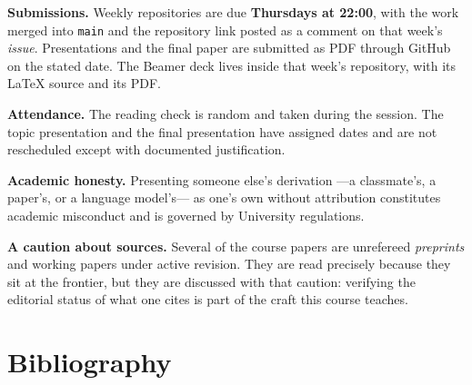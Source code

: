 \documentclass[11pt]{article}
\begin{document}
\textbf{Submissions.} Weekly repositories are due \textbf{Thursdays at 22:00}, with the work merged into \texttt{main} and the repository link posted as a comment on that week's \emph{issue}. Presentations and the final paper are submitted as PDF through GitHub on the stated date. The Beamer deck lives inside that week's repository, with its \LaTeX{} source and its PDF.

\textbf{Attendance.} The reading check is random and taken during the session. The topic presentation and the final presentation have assigned dates and are not rescheduled except with documented justification.

\textbf{Academic honesty.} Presenting someone else's derivation ---a classmate's, a paper's, or a language model's--- as one's own without attribution constitutes academic misconduct and is governed by University regulations.

\textbf{A caution about sources.} Several of the course papers are unrefereed \emph{preprints} and working papers under active revision. They are read precisely because they sit at the frontier, but they are discussed with that caution: verifying the editorial status of what one cites is part of the craft this course teaches.

\section{Bibliography}
\end{document}
